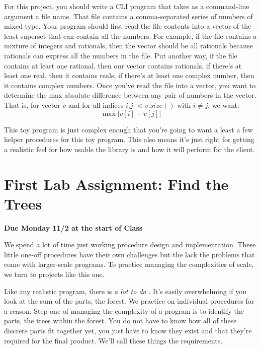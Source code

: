 \documentclass[10pt]{article}
\begin{document}
For this project, you should write a CLI program that takes as a command-line argument a file name. That file contains a comma-separated series of numbers of mixed type. Your program  should first read the file contents into a vector of the least superset that can contain all the numbers. For example, if the file contains a mixture of integers and rationals, then the vector should be all rationals because rationals can express all the numbers in the file. Put another way, if the file contains at least one rational, then our vector contains rationals, if there's at least one real, then it contains reals, if there's at least one complex number, then it contains complex numbers. Once you've read the file into a vector, you want to determine the max absolute difference between any pair of numbers in the vector. That is, for vector $v$ and for all indices $i$,$j$ $< v.size()$ with $i\neq j$, we want:
\begin{equation}
\max | v[i] - v[j] |
\end{equation}

This toy program is just complex enough that you're going to want a least a few helper procedures for this toy program. This also means it's just right for getting a realistic feel for how usable the library is and how it will perform for the client.

\section{First Lab Assignment: Find the Trees }

\begin{center}
\textbf{Due Monday 11/2 at the start of Class}
\end{center}

We spend a lot of time just working procedure design and implementation. These little one-off procedures have their own challenges but the lack the problems that come with larger-scale programs. To practice managing the complexities of scale, we turn to projects like this one. 

Like any realistic program, there is \textit{a lot to do} . It's easily overwhelming if you look at the sum of the parts, the forest. We practice on individual procedures for a reason. Step one of managing the complexity of a program is to identify the parts, the trees within the forest. You do not have to know how all of these discrete parts fit together yet, you just have to know they exist and that they're required for the final product. We'll call these things the requirements. 
\end{document}
